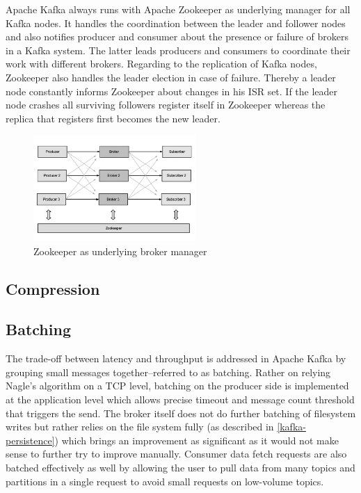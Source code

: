 Apache Kafka always runs with Apache Zookeeper  as underlying manager for all
Kafka nodes. It handles the coordination between the leader and follower nodes
and also notifies producer and consumer about the presence or failure of brokers in a
Kafka system. The latter leads producers and consumers to coordinate their work
with different brokers. Regarding to the replication of Kafka nodes, Zookeeper
also handles the leader election in case of failure. Thereby a leader node
constantly informs Zookeeper about changes in his ISR set. If the leader node
crashes all surviving followers register itself in Zookeeper whereas
the replica that registers first becomes the new leader.
\cite{kafka-wiki-replication} \cite{ArtKafkaInfoQ}

\begin{figure}[H]
    \centering
    \includegraphics[width=0.55\textwidth]{images/kafka-replication-zookeeper.png}
    \caption{Zookeeper as underlying broker manager \cite{ArtKafkaInfoQ}}
    \label{fig:the-log}
\end{figure}

\subsection{Compression}

\subsection{Batching}
\label{intro-kafka-components-batching}

The trade-off between latency and throughput is addressed in Apache Kafka by
grouping small messages together--referred to as batching. Rather on relying
Nagle's algorithm on a TCP level, batching on the producer side is implemented
at the application level which allows precise timeout and message count
threshold that triggers the send. The broker itself does not do further batching
of filesystem writes but rather relies on the file system fully (as described in
\ref{kafka-persistence}) which brings an improvement as significant as it would
not make sense to further try to improve manually. Consumer data fetch requests
are also batched effectively as well by allowing the user to pull data from many
topics and partitions in a single request to avoid small requests on low-volume
topics. \cite{goodhope2012building}

